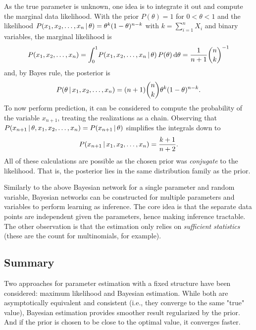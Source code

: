 			As the true parameter is unknown, one idea is to integrate it out and compute the marginal data likelihood. With the prior \( P(\theta) = 1 \) for \( 0 < \theta < 1 \) and the likelihood \( P(x_1, x_2, \dots, x_n \,\vert\, \theta) = \theta^k (1 - \theta)^{n - k} \) with \( k = \sum_{i = 1}^{n} X_i \) and binary variables, the marginal likelihood is
			\begin{equation}
				P(x_1, x_2, \dots, x_n)
					= \int_0^1\! P(x_1, x_2, \dots, x_n \,\vert\, \theta) \, P(\theta) \dd{\theta}
					= \frac{1}{n + 1} { n \choose k }^{-1}
			\end{equation}
			and, by Bayes rule, the posterior is
			\begin{equation}
				P(\theta \,\vert\, x_1, x_2, \dots, x_n)
					= (n + 1) { n \choose k } \theta^k (1 - \theta)^{n - k}.
			\end{equation}
			To now perform prediction, it can be considered to compute the probability of the variable \(x_{n + 1}\), treating the realizations as a chain. Observing that \( P(x_{n + 1} \,\vert\, \theta, x_1, x_2, \dots, x_n) = P(x_{n + 1} \,\vert\, \theta) \) simplifies the integrals down to
			\begin{equation}
				P(x_{n + 1} \,\vert\, x_1, x_2, \dots, x_n) = \frac{k + 1}{n + 2}.
			\end{equation}
			All of these calculations are possible as the chosen prior was \emph{conjugate} to the likelihood. That is, the posterior lies in the same distribution family as the prior.

			Similarly to the above Bayesian network for a single parameter and random variable, Bayesian networks can be constructed for multiple parameters and variables to perform learning as inference. The core idea is that the separate data points are independent given the parameters, hence making inference tractable. The other observation is that the estimation only relies on \emph{sufficient statistics} (these are the count for multinomials, for example).

		\subsection{Summary}
			Two approaches for parameter estimation with a fixed structure have been considered: maximum likelihood and Bayesian estimation. While both are asymptotically equivalent and consistent (i.e., they converge to the same "true" value), Bayesian estimation provides smoother result regularized by the prior. And if the prior is chosen to be close to the optimal value, it converges faster.

